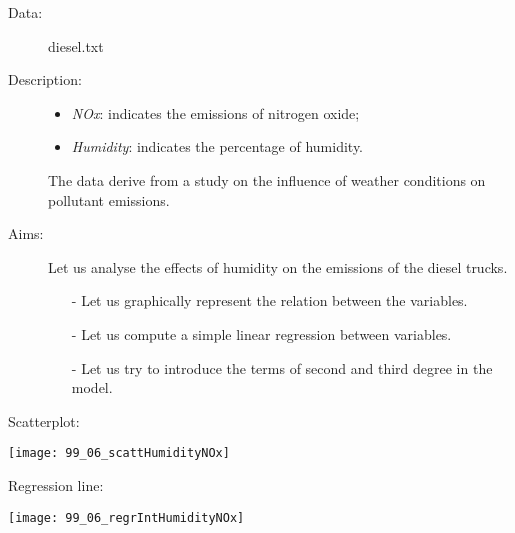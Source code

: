 
\begin{frame}
  \begin{description}
    \item[Data: ]diesel.txt \\ 
    \item[Description: ]
      \begin{footnotesize}
        \begin{itemize}
          \item \textit{NOx}: indicates the emissions of nitrogen oxide;
          \item \textit{Humidity}: indicates the percentage of humidity.
        \end{itemize}
      \end{footnotesize}
      \begin{tiny}
       The data derive from a study on the influence of weather conditions on pollutant emissions.	
      \end{tiny}
    \item[Aims: ]
      \begin{footnotesize}
        Let us analyse the effects of humidity on the emissions of the diesel trucks.
        \begin{itemize}
          \item[-] Let us graphically represent the relation between the variables.
          \item[-] Let us compute a simple linear regression between variables.
          \item[-] Let us try to introduce the terms of second and third degree in the model.
        \end{itemize}
      \end{footnotesize}
  \end{description}
\end{frame}

\begin{frame}
  Scatterplot:\\
  \vspace{.3cm}
  \begin{center}
    \texttt{[image: 99\_06\_scattHumidityNOx]}
  \end{center}
\end{frame}

\begin{frame}
  Regression line:\\
  \vspace{.3cm}
  \begin{center}
    \texttt{[image: 99\_06\_regrIntHumidityNOx]}
  \end{center}
\end{frame}

